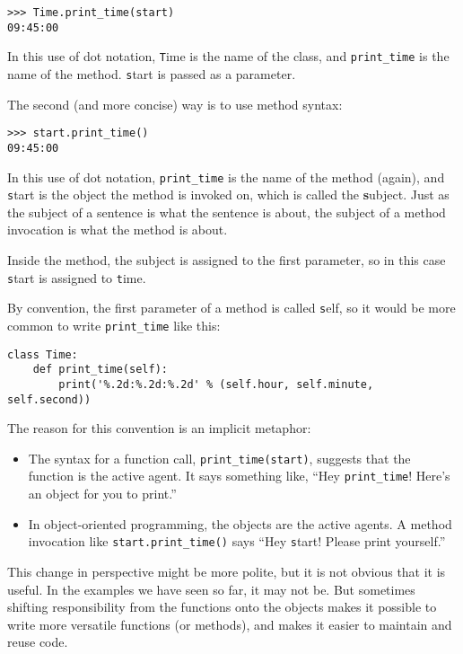 \documentclass[
DIV=11,
fontsize=12,
twoside,
headinclude=false,
titlepage=firstiscover,
abstract=true,
headsepline=true,
footsepline=true,
chapterprefix=true, %
headings=big,
bibliography=totoc,%
captions=tableheading
]{scrbook}
\theoremstyle{definition}
\begin{document}
\begin{lstlisting}
>>> Time.print_time(start)
09:45:00
\end{lstlisting}
%
In this use of dot notation, {\texttt Time} is the name of the class,
and \verb"print_time" is the name of the method.  {\texttt start} is
passed as a parameter.

The second (and more concise) way is to use method syntax:

\begin{lstlisting}
>>> start.print_time()
09:45:00
\end{lstlisting}
%
In this use of dot notation, \verb"print_time" is the name of the
method (again), and {\texttt start} is the object the method is
invoked on, which is called the {\textbf subject}.  Just as the
subject of a sentence is what the sentence is about, the subject
of a method invocation is what the method is about.

Inside the method, the subject is assigned to the first
parameter, so in this case {\texttt start} is assigned
to {\texttt time}.

By convention, the first parameter of a method is
called {\texttt self}, so it would be more common to write
\verb"print_time" like this:

\begin{lstlisting}
class Time:
    def print_time(self):
        print('%.2d:%.2d:%.2d' % (self.hour, self.minute, self.second))
\end{lstlisting}
%
The reason for this convention is an implicit metaphor:

\begin{itemize}

\item The syntax for a function call, \verb"print_time(start)",
  suggests that the function is the active agent.  It says something
  like, ``Hey \verb"print_time"!  Here's an object for you to print.''

\item In object-oriented programming, the objects are the active
  agents.  A method invocation like \verb"start.print_time()" says
  ``Hey {\texttt start}!  Please print yourself.''

\end{itemize}

This change in perspective might be more polite, but it is not obvious
that it is useful.  In the examples we have seen so far, it may not
be.  But sometimes shifting responsibility from the functions onto the
objects makes it possible to write more versatile functions (or
methods), and makes it easier to maintain and reuse code.
\end{document}
